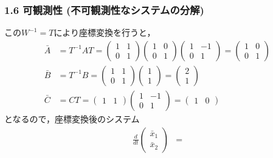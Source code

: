 \documentclass[10pt]{beamer}
\begin{document}
\begin{frame}[t]
\frametitle{1.6 可観測性 (不可観測性なシステムの分解)}
この$W^{-1} = T$により座標変換を行うと，
\begin{align}
 \bar{A} &= T^{-1}AT =
 \left(
 \begin{array}{cc}
  1 & 1 \\
  0 & 1
 \end{array}
 \right)
 \left(
 \begin{array}{cc}
  1 & 0 \\
  0 & 1
 \end{array}
 \right)
 \left(
 \begin{array}{cc}
  1 & -1 \\
  0 & 1
 \end{array}
 \right) =
 \left(
 \begin{array}{cc}
  1 & 0 \\
  0 & 1
 \end{array}
 \right) \\
 \bar{B} &= T^{-1}B =
 \left(
 \begin{array}{cc}
  1 & 1 \\
  0 & 1
 \end{array}
 \right)
 \left(
 \begin{array}{c}
  1 \\
  1
 \end{array}
 \right) =
 \left(
 \begin{array}{c}
  2 \\
  1
 \end{array}
 \right) \\
 \bar{C} &= CT =
 \left(
 \begin{array}{cc}
  1 & 1
 \end{array}
 \right)
 \left(
 \begin{array}{cc}
  1 & -1 \\
  0 & 1
 \end{array}
 \right) =
 \left(
 \begin{array}{cc}
  1 & 0
 \end{array}
 \right)
\end{align}
となるので，座標変換後のシステム
\begin{align}
 \frac{d}{dt}
  \left(
   \begin{array}{c}
    \bar{x}_1 \\
    \bar{x}_2
   \end{array}
  \right) &=

\end{align}
\end{frame}
\end{document}
